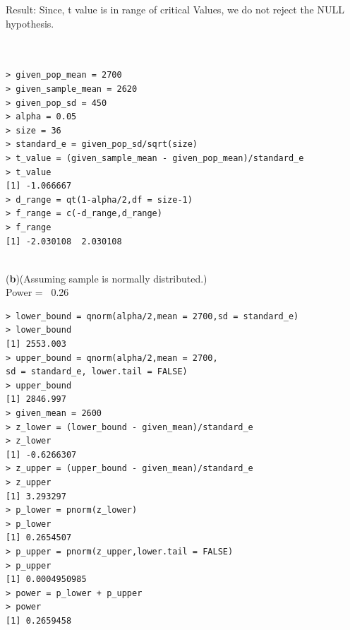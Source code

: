 \documentclass[12pt,letterpaper]{article}
\begin{document}
	  Result: Since, t value is in range of critical Values,
      we do not reject the NULL hypothesis.\\
      \\
      
      \begin{lstlisting}[label=R Code,caption=Q5(a) R Code Output]
      
> given_pop_mean = 2700
> given_sample_mean = 2620
> given_pop_sd = 450
> alpha = 0.05
> size = 36
> standard_e = given_pop_sd/sqrt(size)
> t_value = (given_sample_mean - given_pop_mean)/standard_e
> t_value
[1] -1.066667
> d_range = qt(1-alpha/2,df = size-1)
> f_range = c(-d_range,d_range)
> f_range
[1] -2.030108  2.030108
          
\end{lstlisting}
{(\textbf{b})}(Assuming sample is normally distributed.)\\
Power = \ 0.26\\
\begin{lstlisting}[label=R Code,caption=Q5(b) R Code Output]
> lower_bound = qnorm(alpha/2,mean = 2700,sd = standard_e)
> lower_bound
[1] 2553.003
> upper_bound = qnorm(alpha/2,mean = 2700,
sd = standard_e, lower.tail = FALSE)
> upper_bound
[1] 2846.997
> given_mean = 2600
> z_lower = (lower_bound - given_mean)/standard_e
> z_lower
[1] -0.6266307
> z_upper = (upper_bound - given_mean)/standard_e
> z_upper
[1] 3.293297
> p_lower = pnorm(z_lower)
> p_lower
[1] 0.2654507
> p_upper = pnorm(z_upper,lower.tail = FALSE)
> p_upper
[1] 0.0004950985
> power = p_lower + p_upper
> power
[1] 0.2659458
\end{lstlisting}
\end{document}
